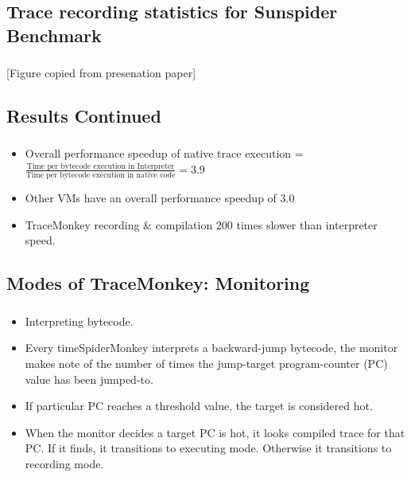 \documentclass[mathserif,10pt]{beamer}
\newcommand{\cmt}[1]{}
\begin{document}
\subsection{Trace recording statistics for Sunspider Benchmark}
\frame
{
  \frametitle{\subsecname}
  \begin{figure}[h]
  \centering
  \end{figure}
  [Figure copied from presenation paper]
}

\subsection{Results Continued}
\frame
{
  \frametitle{\subsecname}
  \begin{itemize}
    \item Overall performance speedup of native trace execution  = $\frac{\text{Time per bytecode execution in Interpreter}}{\text{Time per bytecode execution in native code}  } = 3.9$
      \cmt{
    \item Native trace takes 9 cycles/ byte code as compared to the interpreter ( 35 cycle/ bytecode) 
      }
    \item Other VMs have an overall performance speedup of 3.0
    \item TraceMonkey recording \& compilation 200 times slower than interpreter speed.
  \end{itemize}
}

\subsection{Modes of TraceMonkey: Monitoring}
\frame
{
  \frametitle{\subsecname}
  \begin{itemize} 
  \item Interpreting bytecode. 
  \item Every timeSpiderMonkey interprets a backward-jump bytecode, the monitor makes note of the number
    of times the jump-target program-counter (PC) value has been jumped-to.
   \item  If particular PC reaches a threshold value, the target is considered hot.
    \item When the monitor decides a target PC is hot, it looks compiled trace for that PC. If it finds, it transitions to executing mode. Otherwise it transitions to recording mode.
  \end{itemize}  
}
\end{document}
